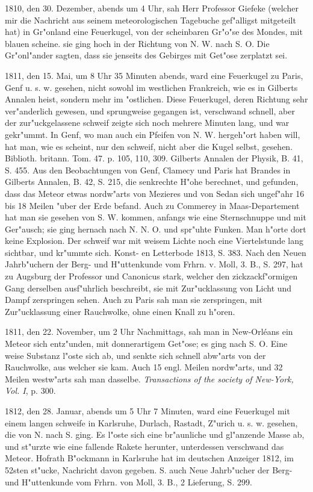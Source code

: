 \documentclass[a4paper, 11pt, oneside, polutonikogreek, german]{article}
\begin{document}
1810, den 30. Dezember, abends um 4 Uhr, sah Herr Professor Giefeke (welcher mir die Nachricht aus seinem meteorologischen Tagebuche gef"alligst mitgeteilt hat) in Gr"onland eine Feuerkugel, von der scheinbaren Gr"o"se des Mondes, mit blauen scheine. sie ging hoch in der Richtung von N. W. nach S. O. Die Gr"onl"ander sagten, dass sie jenseits des Gebirges mit Get"ose zerplatzt sei.

1811, den 15. Mai, um 8 Uhr 35 Minuten abends, ward eine Feuerkugel zu Paris, Genf u. s. w. gesehen, nicht sowohl im westlichen Frankreich, wie es in Gilberts Annalen heist, sondern mehr im "ostlichen. Diese Feuerkugel, deren Richtung sehr ver"anderlich gewesen, und sprungweise gegangen ist, verschwand schnell, aber der zur"uckgelassene schweif zeigte sich noch mehrere Minuten lang, und war gekr"ummt. In Genf, wo man auch ein Pfeifen von N. W. hergeh"ort haben will, hat man, wie es scheint, nur den schweif, nicht aber die Kugel selbst, gesehen. Biblioth. britann. Tom. 47. p. 105, 110, 309. Gilberts Annalen der Physik, B. 41, S. 455. Aus den Beobachtungen von Genf, Clamecy und Paris hat Brandes in Gilberts Annalen, B. 42, S. 215, die senkrechte H"ohe berechnet, und gefunden, dass das Meteor etwas nordw"arts von Mezieres und von Sedan sich ungef"ahr 16 bis 18 Meilen "uber der Erde befand. Auch zu Commerey in Maas-Departement hat man sie gesehen von S. W. kommen, anfangs wie eine Sternschnuppe und mit Ger"ausch; sie ging hernach nach N. N. O. und spr"uhte Funken. Man h"orte dort keine Explosion. Der schweif war mit weisem Lichte noch eine Viertelstunde lang sichtbar, und kr"ummte sich. Konst- en Letterbode 1813, S. 383. Nach den Neuen Jahrb"uchern der Berg- und H"uttenkunde vom Frhrn. v. Moll, 3. B., S. 297, hat zu Augsburg der Professor und Canonicus stark, welcher den zickzackf"ormigen Gang derselben ausf"uhrlich beschreibt, sie mit Zur"ucklassung von Licht und Dampf zerspringen sehen. Auch zu Paris sah man sie zerspringen, mit Zur"ucklassung einer Rauchwolke, ohne einen Knall zu h"oren.

1811, den 22. November, um 2 Uhr Nachmittags, sah man in New-Orléans ein Meteor sich entz"unden, mit donnerartigem Get"ose; es ging nach S. O. Eine weise Substanz l"oste sich ab, und senkte sich schnell abw"arts von der Rauchwolke, aus welcher sie kam. Auch 15 engl. Meilen nordw"arts, und 32 Meilen westw"arts sah man dasselbe. \emph{Transactions of the society of New-York, Vol. I}, p. 300.

1812, den 28. Januar, abends um 5 Uhr 7 Minuten, ward eine Feuerkugel mit einem langen schweife in Karlsruhe, Durlach, Rastadt, Z"urich u. s. w. gesehen, die von N. nach S. ging. Es l"oste sich eine br"aunliche und gl"anzende Masse ab, und st"urzte wie eine fallende Rakete herunter, unterdessen verschwand das Meteor. Hofrath B"ockmann in Karlsruhe hat im deutschen Anzeiger 1812, im 52sten st"ucke, Nachricht davon gegeben. S. auch Neue Jahrb"ucher der Berg- und H"uttenkunde vom Frhrn. von Moll, 3. B., 2 Lieferung, S. 299.
\end{document}
